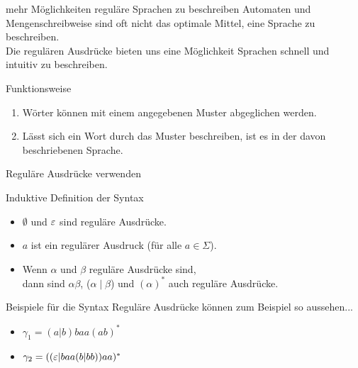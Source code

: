 %
%
%
%

\begin{frame}[fragile]{mehr Möglichkeiten reguläre Sprachen zu beschreiben}
    Automaten und Mengenschreibweise sind oft nicht das optimale Mittel, eine Sprache zu beschreiben.\\
    Die \alert{regulären Ausdrücke} bieten uns eine Möglichkeit Sprachen schnell und intuitiv zu beschreiben.
    \begin{alertblock}{Funktionsweise}
        \begin{enumerate}
            \item Wörter können mit einem angegebenen Muster abgeglichen werden.
            \item Lässt sich ein Wort durch das Muster beschreiben, ist es in der davon beschriebenen Sprache.
        \end{enumerate}
    \end{alertblock}
\end{frame}

\begin{frame}{Reguläre Ausdrücke verwenden}
    \begin{alertblock}{Induktive Definition der Syntax}
        \begin{itemize}
            \item \alert{$\emptyset$} und \alert{$\varepsilon$} sind reguläre Ausdrücke.
            \item \alert{$a$} ist ein regulärer Ausdruck (für alle $a \in \Sigma$).
            \item Wenn \alert{$\alpha$} und \alert{$\beta$} reguläre Ausdrücke sind,\\dann sind \alert{$\alpha \beta$}, \alert{($\alpha \mid \beta$)} und \alert{$(\alpha)^*$} auch reguläre Ausdrücke.
        \end{itemize}
    \end{alertblock}
    \begin{exampleblock}{Beispiele für die Syntax}
        Reguläre Ausdrücke können zum Beispiel so aussehen...
        \begin{itemize}

            \item $\gamma_1 = (a | b) baa (ab)^*$
            \item $\gamma_2 = ((\varepsilon | baa (b | bb)) aa)^*$
        \end{itemize}
    \end{exampleblock}
\end{frame}

